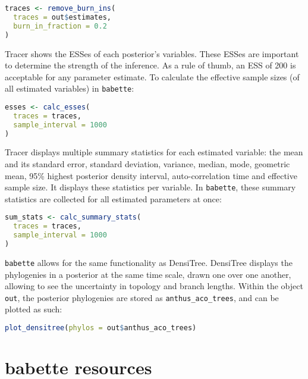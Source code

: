 \documentclass{article}
\begin{document}
\begin{lstlisting}[language=R, floatplacement=H]
traces <- remove_burn_ins(
  traces = out$estimates, 
  burn_in_fraction = 0.2
)
\end{lstlisting}
Tracer shows the ESSes of each posterior's variables.
These ESSes are important to determine the strength of the
inference. As a rule of thumb, an ESS of 200 is acceptable 
for any parameter estimate.
To calculate the effective sample sizes (of all estimated variables) in \verb;babette;:

\begin{lstlisting}[language=R, floatplacement=H]
esses <- calc_esses(
  traces = traces, 
  sample_interval = 1000
)
\end{lstlisting}
Tracer displays multiple summary statistics for each
estimated variable: the mean and its standard error, standard deviation,
variance, median, mode, geometric mean, 95\% highest posterior density interval, 
auto-correlation time and effective sample size. It displays these statistics per
variable. In \verb;babette;, these summary statistics are collected for
all estimated parameters at once: 

\begin{lstlisting}[language=R, floatplacement=H]
sum_stats <- calc_summary_stats(
  traces = traces, 
  sample_interval = 1000
)
\end{lstlisting}
\verb;babette; allows for the same functionality as DensiTree.
DensiTree displays the phylogenies in a posterior at the same
time scale, drawn one over one another, allowing to see the uncertainty in
topology and branch lengths. Within the object \verb;out;, 
the posterior phylogenies are stored as \verb;anthus_aco_trees;,
and can be plotted as such:

\begin{lstlisting}[language=R, floatplacement=H]
plot_densitree(phylos = out$anthus_aco_trees)
\end{lstlisting}

\section{babette resources}
\end{document}
